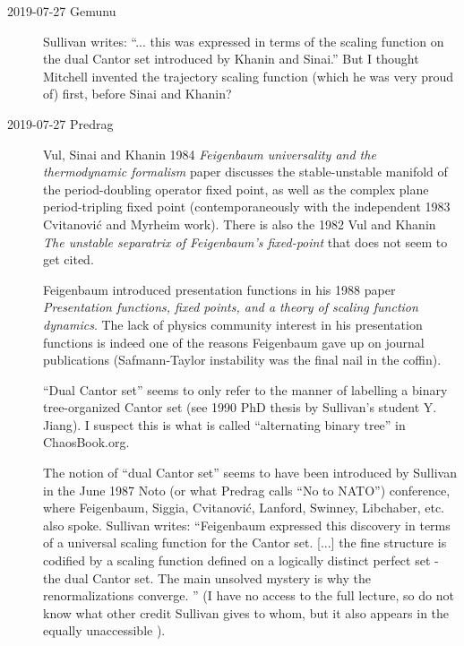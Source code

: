 \begin{description}
\item[2019-07-27 Gemunu]
Sullivan writes: ``... this was expressed in terms of the scaling
function on the dual Cantor set introduced by Khanin and Sinai.'' But I
thought Mitchell invented the trajectory scaling function (which he was
very proud of) first, before Sinai and Khanin?

\item[2019-07-27 Predrag]
Vul, Sinai and Khanin 1984 {\em Feigenbaum universality and
the thermodynamic formalism} paper discusses the stable-unstable manifold
of the period-doubling operator fixed point, as well as the complex plane
period-tripling fixed point (contemporaneously with the independent 1983
Cvitanovi{\'c} and Myrheim work). There is also the
1982 Vul and Khanin {\em The unstable separatrix of
{Feigenbaum}'s fixed-point} that does not seem to get cited.

Feigenbaum introduced presentation functions in his 1988
paper {\em Presentation functions, fixed points, and a
theory of scaling function dynamics}. The lack of physics community
interest in his presentation functions is indeed one of the reasons
Feigenbaum gave up on journal publications
(Safmann-Taylor instability was the final nail in the
coffin).

``Dual Cantor set'' {seems to only} refer to the manner of labelling a
binary tree-organized Cantor set (see 1990 PhD thesis by Sullivan's
student
{Y. Jiang}). I suspect this is what is called ``alternating  binary
tree'' in
{ChaosBook.org}.

The notion of ``dual Cantor set'' seems to have been introduced by
Sullivan in the June 1987 Noto (or what Predrag calls ``No
to NATO'') conference, where Feigenbaum, Siggia,
Cvitanovi{\'c}, Lanford, Swinney, Libchaber, etc. also spoke. Sullivan
writes: ``Feigenbaum expressed this discovery in terms of a universal
scaling function for the Cantor set. [...] the fine structure is codified
by a scaling function defined on a logically distinct perfect set - the
dual Cantor set. The main unsolved mystery is why the renormalizations
converge. '' (I have no access to the full lecture, so do not know what
other credit Sullivan gives to whom, but it also appears in the equally
unaccessible ).


\end{description}
